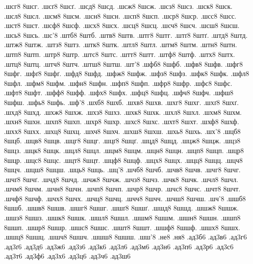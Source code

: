 {.шсг8 8шсг.
.шсґ8 8шсґ.
.шсд8 8шсд.
.шсж8 8шсж.
.шсз8 8шсз.
.шск8 8шск.
.шсл8 8шсл.
.шсм8 8шсм.
.шсн8 8шсн.
.шсп8 8шсп.
.шср8 8шср.
.шсс8 8шсс.
.шст8 8шст.
.шсф8 8шсф.
.шсх8 8шсх.
.шсц8 8шсц.
.шсч8 8шсч.
.шсш8 8шсш.
.шсь8 8шсь.
.шс'8
.штб8 8штб.
.штв8 8штв.
.штг8 8штг.
.штґ8 8штґ.
.штд8 8штд.
.штж8 8штж.
.штз8 8штз.
.штк8 8штк.
.штл8 8штл.
.штм8 8штм.
.штн8 8штн.
.штп8 8штп.
.штр8 8штр.
.штс8 8штс.
.штт8 8штт.
.штф8 8штф.
.штх8 8штх.
.штц8 8штц.
.штч8 8штч.
.штш8 8штш.
.шт'8
.шфб8 8шфб.
.шфв8 8шфв.
.шфг8 8шфг.
.шфґ8 8шфґ.
.шфд8 8шфд.
.шфж8 8шфж.
.шфз8 8шфз.
.шфк8 8шфк.
.шфл8 8шфл.
.шфм8 8шфм.
.шфн8 8шфн.
.шфп8 8шфп.
.шфр8 8шфр.
.шфс8 8шфс.
.шфт8 8шфт.
.шфф8 8шфф.
.шфх8 8шфх.
.шфц8 8шфц.
.шфч8 8шфч.
.шфш8 8шфш.
.шфь8 8шфь.
.шф'8
.шхб8 8шхб.
.шхв8 8шхв.
.шхг8 8шхг.
.шхґ8 8шхґ.
.шхд8 8шхд.
.шхж8 8шхж.
.шхз8 8шхз.
.шхк8 8шхк.
.шхл8 8шхл.
.шхм8 8шхм.
.шхн8 8шхн.
.шхп8 8шхп.
.шхр8 8шхр.
.шхс8 8шхс.
.шхт8 8шхт.
.шхф8 8шхф.
.шхх8 8шхх.
.шхц8 8шхц.
.шхч8 8шхч.
.шхш8 8шхш.
.шхь8 8шхь.
.шх'8
.шцб8 8шцб.
.шцв8 8шцв.
.шцг8 8шцг.
.шцґ8 8шцґ.
.шцд8 8шцд.
.шцж8 8шцж.
.шцз8 8шцз.
.шцк8 8шцк.
.шцл8 8шцл.
.шцм8 8шцм.
.шцн8 8шцн.
.шцп8 8шцп.
.шцр8 8шцр.
.шцс8 8шцс.
.шцт8 8шцт.
.шцф8 8шцф.
.шцх8 8шцх.
.шцц8 8шцц.
.шцч8 8шцч.
.шцш8 8шцш.
.шць8 8шць.
.шц'8
.шчб8 8шчб.
.шчв8 8шчв.
.шчг8 8шчг.
.шчґ8 8шчґ.
.шчд8 8шчд.
.шчж8 8шчж.
.шчз8 8шчз.
.шчк8 8шчк.
.шчл8 8шчл.
.шчм8 8шчм.
.шчн8 8шчн.
.шчп8 8шчп.
.шчр8 8шчр.
.шчс8 8шчс.
.шчт8 8шчт.
.шчф8 8шчф.
.шчх8 8шчх.
.шчц8 8шчц.
.шчч8 8шчч.
.шчш8 8шчш.
.шч'8
.шшб8 8шшб.
.шшв8 8шшв.
.шшг8 8шшг.
.шшґ8 8шшґ.
.шшд8 8шшд.
.шшж8 8шшж.
.шшз8 8шшз.
.шшк8 8шшк.
.шшл8 8шшл.
.шшм8 8шшм.
.шшн8 8шшн.
.шшп8 8шшп.
.шшр8 8шшр.
.шшс8 8шшс.
.шшт8 8шшт.
.шшф8 8шшф.
.шшх8 8шшх.
.шшц8 8шшц.
.шшч8 8шшч.
.шшш8 8шшш.
.шш'8
%
%
%
.не8
.ня8
%
%
%
.ад3б6
.ад3в6
.ад3г6
.ад3ґ6
.ад3д6
.ад3ж6
.ад3з6
.ад3к6
.ад3л6
.ад3м6
.ад3н6
.ад3п6
.ад3р6
.ад3с6
.ад3т6
.ад3ф6
.ад3х6
.ад3ц6
.ад3ч6
.ад3ш6
}
